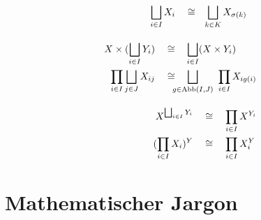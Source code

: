 \begin{align*}
\begin{split}
    \bigsqcup_{i\in I} X_i & \quad\cong\quad \smashoperator[l]{\bigsqcup_{k\in K}} X_{\sigma(k)}
    \end{split} \\[1em]
    \begin{split}
        X \times (\bigsqcup_{i\in I} Y_i) & \quad\cong\quad \smashoperator[l]{\bigsqcup_{i\in I}} (X\times Y_i) \\
        \prod_{i\in I} \bigsqcup_{j\in J} X_{ij} & \quad\cong\quad \smashoperator[l]{\bigsqcup_{g\in \Abb(I,J)}}\ \prod_{i\in I} X_{ig(i)}
    \end{split} \\[1em]
    \begin{split}
        X^{\bigsqcup_{i\in I} Y_i} & \quad\cong\quad \smashoperator[l]{\prod_{i\in I}} X^{Y_i} \\
        (\prod_{i\in I} X_i)^Y & \quad\cong\quad \smashoperator[l]{\prod_{i\in I}} X_i^Y
    \end{split}
\end{align*}
\endgroup





\chapter{Mathematischer Jargon}


